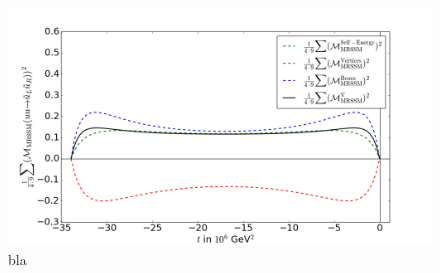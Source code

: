\begin{figure}[!htpb]
\begin{center}
\includegraphics[scale=.5]{figures/MatrixElement_SE_Vertices_Boxes}
\caption{bla}
\end{center}
\end{figure}

